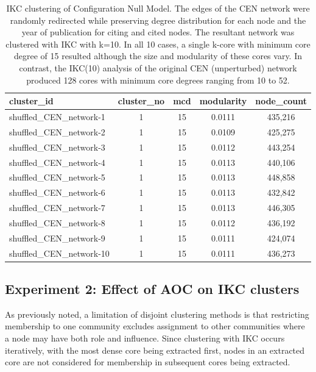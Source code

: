 \documentclass[12pt, oneside]{article}   	%
\begin{document}
\begin{table}[!h]
\centering
\captionsetup{width=0.9\textwidth}
\caption{IKC clustering of Configuration Null Model. The edges of the CEN network were randomly redirected while preserving degree distribution for each node and the year of publication for citing and cited nodes. 
The resultant network was clustered with IKC with k=10.  In all 10 cases, a single k-core with minimum core degree of 15 resulted although the size and modularity of these cores vary. In contrast, the IKC(10) analysis of the original CEN (unperturbed) network produced 128 cores  with minimum core degrees ranging from 10 to 52.}
\begin{tabular}{lcccc}
  \hline
cluster\_id & cluster\_no & mcd & modularity & node\_count  \\ 
  \hline
shuffled\_CEN\_network-1 &     1 &    15 & 0.0111 & 435,216 \\
shuffled\_CEN\_network-2 &     1 &    15 & 0.0109 & 425,275 \\
shuffled\_CEN\_network-3 &     1 &    15 & 0.0112 & 443,254 \\
shuffled\_CEN\_network-4 &     1 &    15 & 0.0113 & 440,106 \\
shuffled\_CEN\_network-5 &     1 &    15 & 0.0113 & 448,858 \\
shuffled\_CEN\_network-6 &     1 &    15 & 0.0113 & 432,842 \\
shuffled\_CEN\_network-7 &     1 &    15 & 0.0113 & 446,305 \\
shuffled\_CEN\_network-8 &     1 &    15 & 0.0112 & 436,192 \\
shuffled\_CEN\_network-9 &     1 &    15 & 0.0111 & 424,074 \\
shuffled\_CEN\_network-10 &    1 &   15 & 0.0111 & 436,273 \\ 
   \hline
\end{tabular}
\label{tab:tab1}
\end{table}

\subsection{Experiment 2: Effect of AOC on IKC clusters} 
As previously noted, a limitation of disjoint clustering methods is that restricting membership to one community excludes assignment to other communities where a node may have both role and influence. Since clustering with IKC occurs iteratively, with the most dense core being extracted first, nodes in an extracted core are not considered for membership in subsequent cores being extracted.
\end{document}

